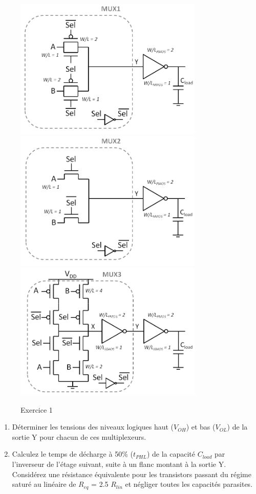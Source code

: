 \documentclass[frenchb,DIV=14]{scrartcl}
\begin{document}
\begin{figure}[!htbp]
   \centering
   \includegraphics[width=9cm]{figures/fig7-3-1.png}
	 \includegraphics[width=9cm]{figures/fig7-3-2.png}
	 \includegraphics[width=9cm]{figures/fig7-3-3.png}
   \caption{Exercice 1}
   \label{fig7-3}
\end{figure}

\begin{enumerate}
	\item Déterminer les tensions des niveaux logiques haut ($V_{OH}$) et bas ($V_{OL}$) de
	la sortie Y pour chacun de ces multiplexeurs.
	\item Calculez le temps de décharge à 50\% ($t_{PHL}$) de la capacité $C_{load}$ par
	l'inverseur de l'étage suivant, suite à un flanc montant à la sortie Y. Considérez une
	résistance équivalente pour les transistors passant du régime saturé au linéaire de
	$R_{eq}$ = 2.5 $R_{lin}$ et négliger toutes les capacités parasites.
\end{enumerate}
\end{document}
